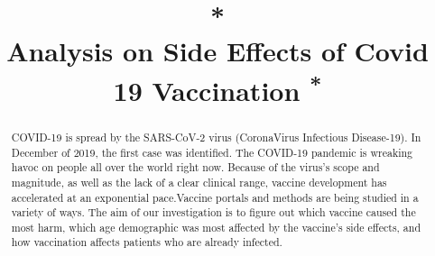 \documentclass[conference]{IEEEtran}
\begin{document}
\title{*\\Analysis on Side Effects of Covid 19 Vaccination
{\footnotesize \textsuperscript{*}}
}

\author{
\and
{}
\and
{}
\and
{}
\and
{}
\and

}

\maketitle

\begin{abstract}
COVID-19 is spread by the SARS-CoV-2 virus (CoronaVirus Infectious Disease-19). In December of 2019, the first case was identified. The COVID-19 pandemic is wreaking havoc on people all over the world right now. Because of the virus's scope and magnitude, as well as the lack of a clear clinical range, vaccine development has accelerated at an exponential pace.Vaccine portals and methods are being studied in a variety of ways.
The aim of our investigation is to figure out which vaccine caused the most harm, which age demographic was most affected by the vaccine's side effects, and how vaccination affects patients who are already infected.
\\




\end{abstract}
\end{document}
